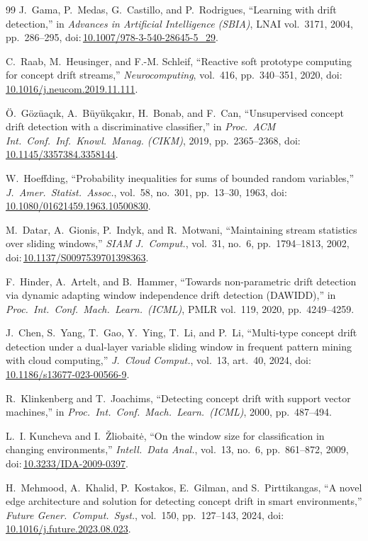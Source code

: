 \documentclass[conference]{IEEEtran}
\newcommand{\doi}[1]{doi:\,\url{#1}}
\begin{document}
\begin{thebibliography}{99}
 J.~Gama, P.~Medas, G.~Castillo, and P.~Rodrigues, ``Learning with drift detection,'' in \emph{Advances in Artificial Intelligence (SBIA)}, LNAI vol.~3171, 2004, pp.~286--295, \doi{10.1007/978-3-540-28645-5_29}.

 C.~Raab, M.~Heusinger, and F.-M. Schleif, ``Reactive soft prototype computing for concept drift streams,'' \emph{Neurocomputing}, vol.~416, pp.~340--351, 2020, \doi{10.1016/j.neucom.2019.11.111}.

 \"O.~G\"oz\"ua\c{c}\i k, A.~B\"uy\"uk\c{c}ak\i r, H.~Bonab, and F.~Can, ``Unsupervised concept drift detection with a discriminative classifier,'' in \emph{Proc.\ ACM Int.\ Conf.\ Inf.\ Knowl.\ Manag. (CIKM)}, 2019, pp.~2365--2368, \doi{10.1145/3357384.3358144}.

 W.~Hoeffding, ``Probability inequalities for sums of bounded random variables,'' \emph{J.\ Amer.\ Statist.\ Assoc.}, vol.~58, no.~301, pp.~13--30, 1963, \doi{10.1080/01621459.1963.10500830}.

 M.~Datar, A.~Gionis, P.~Indyk, and R.~Motwani, ``Maintaining stream statistics over sliding windows,'' \emph{SIAM J.\ Comput.}, vol.~31, no.~6, pp.~1794--1813, 2002, \doi{10.1137/S0097539701398363}.

 F.~Hinder, A.~Artelt, and B.~Hammer, ``Towards non-parametric drift detection via dynamic adapting window independence drift detection (DAWIDD),'' in \emph{Proc.\ Int.\ Conf.\ Mach.\ Learn.\ (ICML)}, PMLR vol.~119, 2020, pp.~4249--4259.

 J.~Chen, S.~Yang, T.~Gao, Y.~Ying, T.~Li, and P.~Li, ``Multi-type concept drift detection under a dual-layer variable sliding window in frequent pattern mining with cloud computing,'' \emph{J.\ Cloud Comput.}, vol.~13, art.~40, 2024, \doi{10.1186/s13677-023-00566-9}.

 R.~Klinkenberg and T.~Joachims, ``Detecting concept drift with support vector machines,'' in \emph{Proc.\ Int.\ Conf.\ Mach.\ Learn.\ (ICML)}, 2000, pp.~487--494.

 L.~I. Kuncheva and I.~\v{Z}liobait\.{e}, ``On the window size for classification in changing environments,'' \emph{Intell.\ Data Anal.}, vol.~13, no.~6, pp.~861--872, 2009, \doi{10.3233/IDA-2009-0397}.

 H.~Mehmood, A.~Khalid, P.~Kostakos, E.~Gilman, and S.~Pirttikangas, ``A novel edge architecture and solution for detecting concept drift in smart environments,'' \emph{Future Gener.\ Comput.\ Syst.}, vol.~150, pp.~127--143, 2024, \doi{10.1016/j.future.2023.08.023}.


\end{thebibliography}
\end{document}

